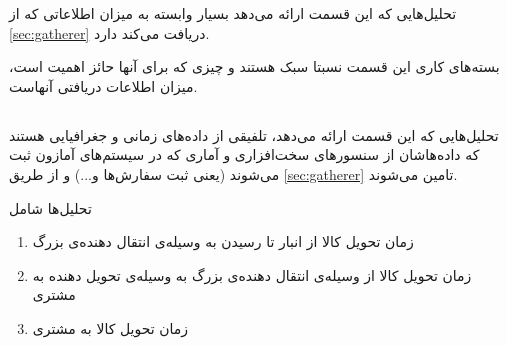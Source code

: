 تحلیل‌هایی که این قسمت ارائه می‌دهد بسیار وابسته به میزان اطلاعاتی که از \ref{sec:gatherer} دریافت می‌کند دارد.

بسته‌های کاری این قسمت نسبتا سبک هستند و چیزی که برای آنها حائز اهمیت است، میزان اطلاعات دریافتی آنهاست.

\subsection{}\label{second-web-service:shipment}
تحلیل‌هایی که این قسمت ارائه می‌دهد، تلفیقی از داده‌های زمانی و جغرافیایی هستند که  داده‌هاشان از سنسور‌های سخت‌افزاری و آماری که در سیستم‌های آمازون ثبت می‌شوند (یعنی ثبت‌ سفارش‌ها و...) و از طریق 
\ref{sec:gatherer}
تامین می‌شوند.

تحلیل‌ها شامل 
\begin{enumerate}
\item 
زمان تحویل کالا از انبار تا رسیدن به وسیله‌ی انتقال دهنده‌ی بزرگ\label{s1}

\item 
زمان تحویل کالا از وسیله‌ی انتقال دهنده‌ی بزرگ به وسیله‌ی تحویل دهنده به مشتری\label{s2}

\item 
زمان تحویل کالا به مشتری\label{s3}
\end{enumerate}


